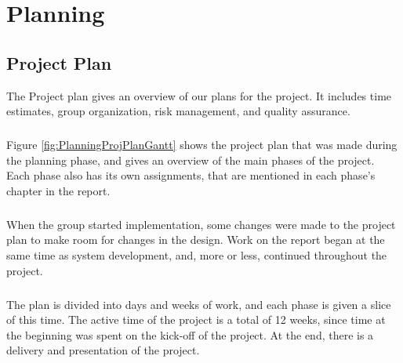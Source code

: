 \chapter{Planning}
\label{chap:Planning}

\section{Project Plan}
\label{sec:PlanningProjPlan}

The Project plan gives an overview of our plans for the project. It includes time estimates, group organization, risk management, and quality assurance.

\paragraph{} Figure \ref{fig:PlanningProjPlanGantt} shows the project plan that was made during the planning phase, and gives an overview of the main phases of the project. Each phase also has its own assignments, that are mentioned in each phase's chapter in the report.

\paragraph{} When the group started implementation, some changes were made to the project plan to make room for changes in the design. Work on the report began at the same time as system development, and, more or less, continued throughout the project.

\paragraph{} The plan is divided into days and weeks of work, and each phase is given a slice of this time. The active time of the project is a total of 12 weeks, since time at the beginning was spent on the kick-off of the project. At the end, there is a delivery and presentation of the project.


